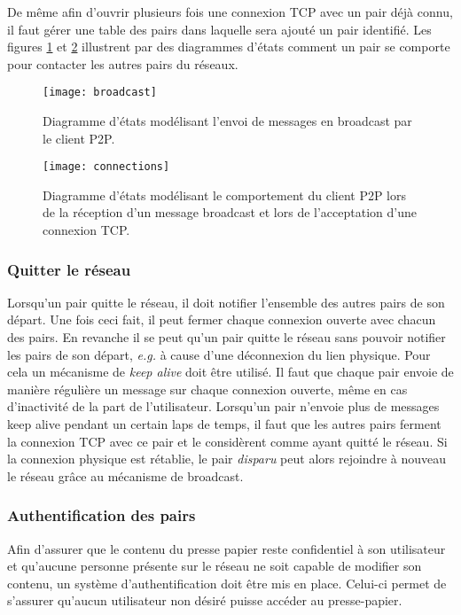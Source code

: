 De même afin d'ouvrir plusieurs fois une connexion TCP avec un pair déjà
connu, il faut gérer une table des pairs dans laquelle sera ajouté un
pair identifié. Les figures \ref{fig:broadcast} et \ref{fig:connections}
illustrent par des diagrammes d'états comment un pair se comporte pour
contacter les autres pairs du réseaux.

\begin{figure}[!h]
  \centering
  \texttt{[image: broadcast]}
  \caption{Diagramme d'états modélisant l'envoi de messages en broadcast
    par le client P2P.}
  \label{fig:broadcast}
\end{figure}

\begin{figure}[!h]
  \centering
  \texttt{[image: connections]}
  \caption{Diagramme d'états modélisant le comportement du client P2P lors
    de la réception d'un message broadcast et lors de l'acceptation d'une
    connexion TCP.}
  \label{fig:connections}
\end{figure}

\subsubsection{Quitter le réseau}
Lorsqu'un pair quitte le réseau, il doit notifier l'ensemble des autres
pairs de son départ. Une fois ceci fait, il peut fermer chaque connexion
ouverte avec chacun des pairs. En revanche il se peut qu'un pair quitte
le réseau sans pouvoir notifier les pairs de son départ, \emph{e.g.}
à cause d'une déconnexion du lien physique. Pour cela un mécanisme
de \emph{keep alive} doit être utilisé. Il faut que chaque pair envoie
de manière régulière un message sur chaque connexion ouverte, même en cas
d'inactivité de la part de l'utilisateur. Lorsqu'un pair n'envoie plus
de messages keep alive pendant un certain laps de temps, il faut que les
autres pairs ferment la connexion TCP avec ce pair et le considèrent comme
ayant quitté le réseau. Si la connexion physique est rétablie, le pair
\emph{disparu} peut alors rejoindre à nouveau le réseau grâce au mécanisme
de broadcast.

\subsubsection{Authentification des pairs}
Afin d'assurer que le contenu du presse papier reste confidentiel à son
utilisateur et qu'aucune personne présente sur le réseau ne soit capable de
modifier son contenu, un système d'authentification doit être mis en place.
Celui-ci permet de s'assurer qu'aucun utilisateur non désiré puisse accéder au
presse-papier.


